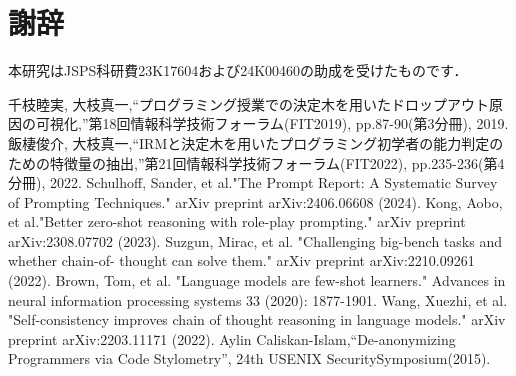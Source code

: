 \documentclass[11pt]{jreport}
\begin{document}
\chapter*{謝辞}
本研究はJSPS科研費23K17604および24K00460の助成を受けたものです．
\begin{thebibliography}{9}
  \renewcommand{\baselinestretch}{1.0}
  千枝睦実, 大枝真一,“プログラミング授業での決定木を用いたドロップアウト原因の可視化,”第18回情報科学技術フォーラム(FIT2019), pp.87-90(第3分冊), 2019.
  飯棲俊介, 大枝真一,“IRMと決定木を用いたプログラミング初学者の能力判定のための特徴量の抽出,”第21回情報科学技術フォーラム(FIT2022), pp.235-236(第4分冊), 2022.
  Schulhoff, Sander, et al."The Prompt Report: A Systematic Survey of Prompting Techniques." arXiv preprint arXiv:2406.06608 (2024).
  Kong, Aobo, et al."Better zero-shot reasoning with role-play prompting." arXiv preprint arXiv:2308.07702 (2023).
  Suzgun, Mirac, et al. "Challenging big-bench tasks and whether chain-of- thought can solve them." arXiv preprint arXiv:2210.09261 (2022).
  Brown, Tom, et al. "Language models are few-shot learners." Advances in neural information processing systems 33 (2020): 1877-1901.
   Wang, Xuezhi, et al. "Self-consistency improves chain of thought reasoning in language models." arXiv preprint arXiv:2203.11171 (2022).
  Aylin Caliskan-Islam,“De-anonymizing Programmers via Code Stylometry”, 24th USENIX SecuritySymposium(2015).
  
\end{thebibliography}

\end{document}
